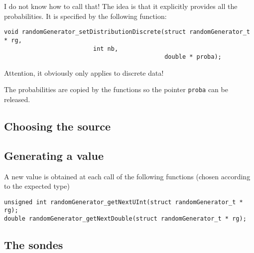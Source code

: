    I do not know how to call that! The idea is that it explicitly provides 
all the probabilities. It is specified by the following function:
   
\begin{verbatim}
void randomGenerator_setDistributionDiscrete(struct randomGenerator_t * rg,
					     int nb,
                                             double * proba);
\end{verbatim}
   
   Attention, it obviously only applies to discrete data!

   The probabilities are copied by the functions so the pointer
{\tt proba} can be released.

%
\subsection{Choosing the source}

%
\subsection{Generating a value}


   A new value is obtained at each call of the following functions 
(chosen according to the expected type)

\begin{verbatim}
unsigned int randomGenerator_getNextUInt(struct randomGenerator_t * rg);
double randomGenerator_getNextDouble(struct randomGenerator_t * rg);
\end{verbatim}

%
\subsection{The sondes}

